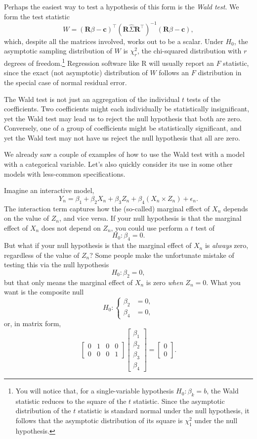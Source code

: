 \documentclass[
  12pt,
  oneside,openany]{book}
\begin{document}
Perhaps the easiest way to test a hypothesis of this form is the \emph{Wald test}. We form the test statistic
\[
W = (\mathbf{R} \beta - \mathbf{c})^\top  (\mathbf{R} \hat{\Sigma} \mathbf{R}^\top)^{-1} (\mathbf{R} \beta - \mathbf{c}),
\]
which, despite all the matrices involved, works out to be a scalar. Under \(H_0\), the asymptotic sampling distribution of \(W\) is \(\chi^2_r\), the chi-squared distribution with \(r\) degrees of freedom.\footnote{You will notice that, for a single-variable hypothesis \(H_0 : \beta_k = b\), the Wald statistic reduces to the square of the \(t\) statistic. Since the asymptotic distribution of the \(t\) statistic is standard normal under the null hypothesis, it follows that the asymptotic distribution of its square is \(\chi^2_1\) under the null hypothesis.} Regression software like R will usually report an \(F\) statistic, since the exact (not asymptotic) distribution of \(W\) follows an \(F\) distribution in the special case of normal residual error.

The Wald test is not just an aggregation of the individual \(t\) tests of the coefficients. Two coefficients might each individually be statistically insignificant, yet the Wald test may lead us to reject the null hypothesis that both are zero. Conversely, one of a group of coefficients might be statistically significant, and yet the Wald test may not have us reject the null hypothesis that all are zero.

We already saw a couple of examples of how to use the Wald test with a model with a categorical variable. Let's also quickly consider its use in some other models with less-common specifications.

Imagine an interactive model,
\[
Y_n = \beta_1 + \beta_2 X_n + \beta_3 Z_n + \beta_4 (X_n \times Z_n) + \epsilon_n.
\]
The interaction term captures how the (so-called) marginal effect of \(X_n\) depends on the value of \(Z_n\), and vice versa. If your null hypothesis is that the marginal effect of \(X_n\) does not depend on \(Z_n\), you could use perform a \(t\) test of
\[
H_0 : \beta_4 = 0.
\]
But what if your null hypothesis is that the marginal effect of \(X_n\) is \emph{always} zero, regardless of the value of \(Z_n\)? Some people make the unfortunate mistake of testing this via the null hypothesis
\[
H_0 : \beta_2 = 0,
\]
but that only means the marginal effect of \(X_n\) is zero \emph{when \(Z_n = 0\)}. What you want is the composite null
\[
H_0 : \left\{ \begin{aligned}
  \beta_2 &= 0, \\
  \beta_4 &= 0,
\end{aligned} \right.
\]
or, in matrix form,
\[
\begin{bmatrix}
  0 & 1 & 0 & 0 \\
  0 & 0 & 0 & 1
\end{bmatrix}
\begin{bmatrix}
  \beta_1 \\ \beta_2 \\ \beta_3 \\ \beta_4
\end{bmatrix}
=
\begin{bmatrix}
  0 \\ 0
\end{bmatrix}.
\]
\end{document}
